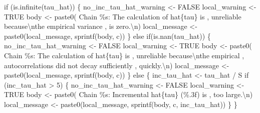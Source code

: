 \documentclass[
  letterpaper,
  DIV=11,
  numbers=noendperiod]{scrartcl}
\newenvironment{Shaded}{\begin{snugshade}}{\end{snugshade}}
\newcommand{\CharTok}[1]{\textcolor[rgb]{0.13,0.47,0.30}{#1}}
\newcommand{\ControlFlowTok}[1]{\textcolor[rgb]{0.00,0.23,0.31}{#1}}
\newcommand{\DecValTok}[1]{\textcolor[rgb]{0.68,0.00,0.00}{#1}}
\newcommand{\KeywordTok}[1]{\textcolor[rgb]{0.00,0.23,0.31}{#1}}
\newcommand{\NormalTok}[1]{\textcolor[rgb]{0.00,0.23,0.31}{#1}}
\newcommand{\OperatorTok}[1]{\textcolor[rgb]{0.37,0.37,0.37}{#1}}
\newcommand{\SpecialCharTok}[1]{\textcolor[rgb]{0.37,0.37,0.37}{#1}}
\newcommand{\StringTok}[1]{\textcolor[rgb]{0.13,0.47,0.30}{#1}}
\begin{document}
\begin{Shaded}
\begin{Highlighting}[]
      \ControlFlowTok{if}\NormalTok{ (}\KeywordTok{is}\NormalTok{.infinite(tau\_hat)) \{}
\NormalTok{        no\_inc\_tau\_hat\_warning }\OperatorTok{\textless{}{-}}\NormalTok{ FALSE}
\NormalTok{        local\_warning }\OperatorTok{\textless{}{-}}\NormalTok{ TRUE}
\NormalTok{        body }\OperatorTok{\textless{}{-}}\NormalTok{ paste0(}\StringTok{\textquotesingle{}  Chain }\SpecialCharTok{\%s}\StringTok{: The calculation of hat}\SpecialCharTok{\{tau\}}\StringTok{ is \textquotesingle{}}\NormalTok{,}
                       \StringTok{\textquotesingle{}unreliable because}\CharTok{\textbackslash{}n}\StringTok{the empirical variance \textquotesingle{}}\NormalTok{,}
                       \StringTok{\textquotesingle{}is zero.}\CharTok{\textbackslash{}n}\StringTok{\textquotesingle{}}\NormalTok{)}
\NormalTok{        local\_message }\OperatorTok{\textless{}{-}}\NormalTok{ paste0(local\_message, sprintf(body, c))}
\NormalTok{      \} }\ControlFlowTok{else} \ControlFlowTok{if}\NormalTok{(}\KeywordTok{is}\NormalTok{.nan(tau\_hat)) \{}
\NormalTok{        no\_inc\_tau\_hat\_warning }\OperatorTok{\textless{}{-}}\NormalTok{ FALSE}
\NormalTok{        local\_warning }\OperatorTok{\textless{}{-}}\NormalTok{ TRUE}
\NormalTok{        body }\OperatorTok{\textless{}{-}}\NormalTok{ paste0(}\StringTok{\textquotesingle{}  Chain }\SpecialCharTok{\%s}\StringTok{: The calculation of hat}\SpecialCharTok{\{tau\}}\StringTok{ is \textquotesingle{}}\NormalTok{,}
                       \StringTok{\textquotesingle{}unreliable because}\CharTok{\textbackslash{}n}\StringTok{the empirical \textquotesingle{}}\NormalTok{,}
                       \StringTok{\textquotesingle{}autocorrelations did not decay sufficiently \textquotesingle{}}\NormalTok{,}
                       \StringTok{\textquotesingle{}quickly.}\CharTok{\textbackslash{}n}\StringTok{\textquotesingle{}}\NormalTok{)}
\NormalTok{        local\_message }\OperatorTok{\textless{}{-}}\NormalTok{ paste0(local\_message, sprintf(body, c))}
\NormalTok{      \} }\ControlFlowTok{else}\NormalTok{ \{}
\NormalTok{        inc\_tau\_hat }\OperatorTok{\textless{}{-}}\NormalTok{ tau\_hat }\OperatorTok{/}\NormalTok{ S}
        \ControlFlowTok{if}\NormalTok{ (inc\_tau\_hat }\OperatorTok{\textgreater{}} \DecValTok{5}\NormalTok{) \{}
\NormalTok{          no\_inc\_tau\_hat\_warning }\OperatorTok{\textless{}{-}}\NormalTok{ FALSE}
\NormalTok{          local\_warning }\OperatorTok{\textless{}{-}}\NormalTok{ TRUE}
\NormalTok{          body }\OperatorTok{\textless{}{-}}\NormalTok{ paste0(}\StringTok{\textquotesingle{}  Chain }\SpecialCharTok{\%s}\StringTok{: Incremental hat}\SpecialCharTok{\{tau\}}\StringTok{ (}\SpecialCharTok{\%.3f}\StringTok{) is \textquotesingle{}}\NormalTok{,}
                       \StringTok{\textquotesingle{}too large.}\CharTok{\textbackslash{}n}\StringTok{\textquotesingle{}}\NormalTok{)}
\NormalTok{          local\_message }\OperatorTok{\textless{}{-}}\NormalTok{ paste0(local\_message,}
\NormalTok{                                  sprintf(body, c, inc\_tau\_hat))}
\NormalTok{        \}}
\NormalTok{      \}}


\end{Highlighting}
\end{Shaded}
\end{document}
